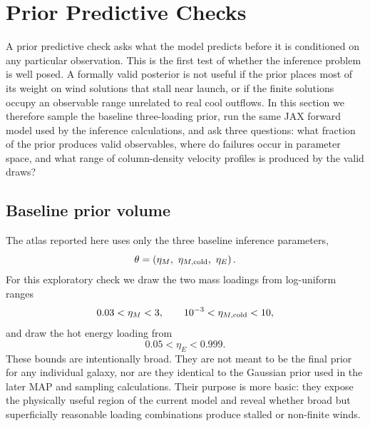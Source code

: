 \section{Prior Predictive Checks}
\label{sec:prior_predictive}

A prior predictive check asks what the model predicts before it is conditioned
on any particular observation.  This is the first test of whether the inference
problem is well posed.  A formally valid posterior is not useful if the prior
places most of its weight on wind solutions that stall near launch, or if the
finite solutions occupy an observable range unrelated to real cool outflows.  In
this section we therefore sample the baseline three-loading prior, run the same
JAX forward model used by the inference calculations, and ask three questions:
what fraction of the prior produces valid observables, where do failures occur
in parameter space, and what range of column-density velocity profiles is
produced by the valid draws?

\subsection{Baseline prior volume}
\label{subsec:prior_predictive_setup}

The atlas reported here uses only the three baseline inference parameters,
\begin{equation}
\theta
=
\left(\eta_M,\ \eta_{M,\rm cold},\ \eta_E\right).
\end{equation}
For this exploratory check we draw the two mass loadings from log-uniform ranges
\begin{equation}
0.03 < \eta_M < 3,\qquad
10^{-3} < \eta_{M,\rm cold} < 10,
\end{equation}
and draw the hot energy loading from
\begin{equation}
0.05 < \eta_E < 0.999 .
\end{equation}
These bounds are intentionally broad.  They are not meant to be the final prior
for any individual galaxy, nor are they identical to the Gaussian prior used in
the later MAP and sampling calculations.  Their purpose is more basic: they
expose the physically useful region of the current model and reveal whether
broad but superficially reasonable loading combinations produce stalled or
non-finite winds.

